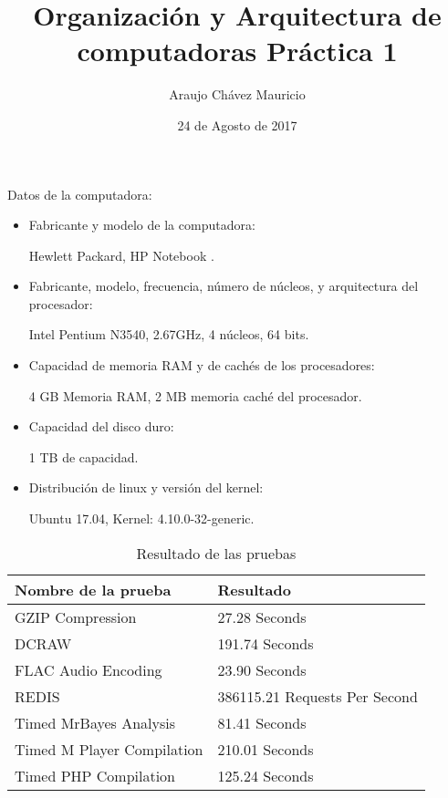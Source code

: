 \documentclass[12pt, letterpaper, twoside]{article}
\title{Organizaci\'on y Arquitectura de computadoras Práctica 1}
\author{Araujo Chávez Mauricio}
\date{24 de Agosto de 2017}
\begin{document}
\maketitle

Datos de la computadora:

\begin{itemize}
\item Fabricante y modelo de la computadora:
  
  Hewlett Packard, HP Notebook .
  
\item Fabricante, modelo, frecuencia, número de núcleos, y arquitectura del procesador:
  
  Intel Pentium N3540, 2.67GHz, 4 núcleos, 64 bits.
  
\item Capacidad de memoria RAM y de cachés de los procesadores:
  
  4 GB Memoria RAM, 2 MB memoria caché del procesador.
    
\item Capacidad del disco duro:
  
  1 TB de capacidad.
  
\item Distribución de linux y versión del kernel:
  
  Ubuntu 17.04, Kernel: 4.10.0-32-generic. 
\end{itemize}

\begin{table}[H]
\begin{center}
\begin{tabular}{|l|l|}
\hline
Nombre de la prueba & Resultado \\
\hline \hline
GZIP Compression & 27.28 Seconds \\ \hline
DCRAW & 191.74 Seconds \\ \hline
FLAC Audio Encoding & 23.90 Seconds \\ \hline
REDIS & 386115.21 Requests Per Second \\ \hline
Timed MrBayes Analysis & 81.41 Seconds \\ \hline
Timed M Player Compilation & 210.01 Seconds \\ \hline
Timed PHP Compilation & 125.24 Seconds\\ \hline
\end{tabular}
\caption{Resultado de las pruebas}
\label{tabla:sencilla}
\end{center}
\end{table}
\end{document}
